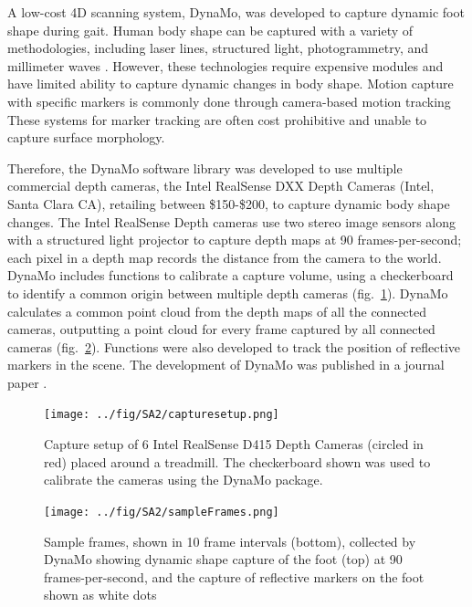 \documentclass[defaultstyle,11pt]{thesis}
\begin{document}
A low-cost 4D scanning system, DynaMo, was developed to capture dynamic foot shape during gait.
Human body shape can be captured with a variety of methodologies, including laser lines, structured light, photogrammetry, and millimeter waves \citep{Daanen2013}.
However, these technologies require expensive modules and have limited ability to capture dynamic changes in body shape.
Motion capture with specific markers is commonly done through camera-based motion tracking \citep{Windolf2008}
These systems for marker tracking are often cost prohibitive and unable to capture surface morphology.

Therefore, the DynaMo software library was developed to use multiple commercial depth cameras, the Intel RealSense DXX Depth Cameras (Intel, Santa Clara CA), retailing between \$150-\$200, to capture dynamic body shape changes.
The Intel RealSense Depth cameras use two stereo image sensors along with a structured light projector to capture depth maps at 90 frames-per-second; each pixel in a depth map records the distance from the camera to the world.
DynaMo includes functions to calibrate a capture volume, using a checkerboard to identify a common origin between multiple depth cameras (fig.~\ref{fig:testSetup}).
DynaMo calculates a common point cloud from the depth maps of all the connected cameras, outputting a point cloud for every frame captured by all connected cameras (fig.~\ref{fig:SA2-sampleFrames}).
Functions were also developed to track the position of reflective markers in the scene.
The development of DynaMo was published in a journal paper \citep{Boppana2019}.

\hypertarget{fig:testSetup}{%
\begin{figure}
\centering
\texttt{[image: ../fig/SA2/capturesetup.png]}
\caption[{Capture setup of 6 Intel RealSense D415 Depth Cameras placed around a treadmill.}]{Capture setup of 6 Intel RealSense D415 Depth Cameras (circled in red) placed around a treadmill. The checkerboard shown was used to calibrate the cameras using the DynaMo package.}
\label{fig:testSetup}
\end{figure}
}

\hypertarget{fig:SA2-sampleFrames}{%
\begin{figure}
\centering
\texttt{[image: ../fig/SA2/sampleFrames.png]}
\caption[{Sample frames collected by DynaMo showing dynamic shape capture of the foot at 90 frames-per-second.}]{Sample frames, shown in 10 frame intervals (bottom), collected by DynaMo showing dynamic shape capture of the foot (top) at 90 frames-per-second, and the capture of reflective markers on the foot shown as white dots}
\label{fig:SA2-sampleFrames}
\end{figure}
}
\end{document}
